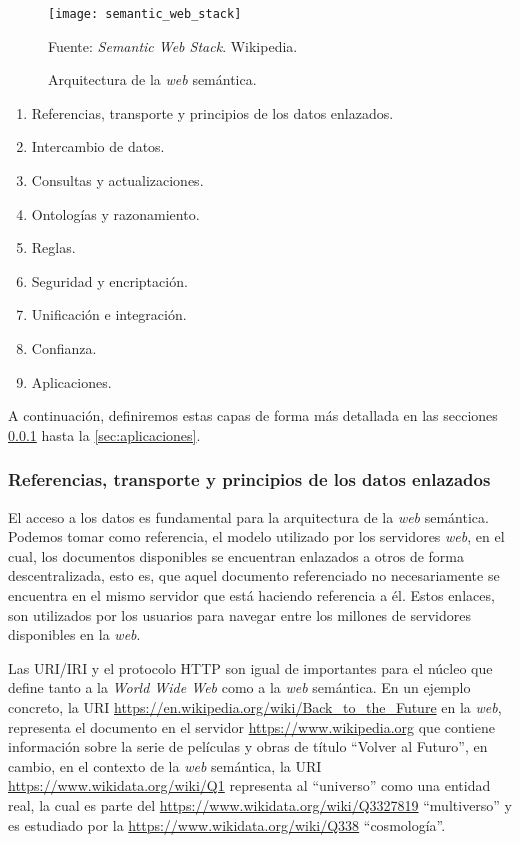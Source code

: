 \begin{figure}
    \centering
    \texttt{[image: semantic\_web\_stack]}
    \caption{Arquitectura de la \textit{web} semántica.} Fuente:
    \textit{Semantic Web Stack}. Wikipedia.
    \label{fig:semantic-web-arq}
\end{figure}

\begin{enumerate}
    \item Referencias, transporte y principios de los datos enlazados.
    \item Intercambio de datos.
    \item Consultas y actualizaciones.
    \item Ontologías y razonamiento.
    \item Reglas.
    \item Seguridad y encriptación.
    \item Unificación e integración.
    \item Confianza.
    \item Aplicaciones.
\end{enumerate}

A continuación, definiremos estas capas de forma más detallada en las secciones
\ref{sec:refs-transporte-enlazados} hasta la \ref{sec:aplicaciones}.

\subsubsection{Referencias, transporte y principios de los datos enlazados}
\label{sec:refs-transporte-enlazados}

El acceso a los datos es fundamental para la arquitectura de la \textit{web}
semántica. Podemos tomar como referencia, el modelo utilizado por los servidores
\textit{web}, en el cual, los documentos disponibles se encuentran enlazados a
otros de forma descentralizada, esto es, que aquel documento referenciado no
necesariamente se encuentra en el mismo servidor que está haciendo referencia a
él. Estos enlaces, son utilizados por los usuarios para navegar entre los
millones de servidores disponibles en la \textit{web}.

Las URI/IRI y el protocolo HTTP son igual de importantes para el núcleo que
define tanto a la \textit{World Wide Web} como a la \textit{web} semántica. En
un ejemplo concreto, la URI
\url{https://en.wikipedia.org/wiki/Back_to_the_Future} en la \textit{web},
representa el documento en el servidor \url{https://www.wikipedia.org} que
contiene información sobre la serie de películas y obras de título ``Volver al
Futuro'', en cambio, en el contexto de la \textit{web} semántica, la URI
\url{https://www.wikidata.org/wiki/Q1} representa al ``universo'' como una
entidad real, la cual es parte del \url{https://www.wikidata.org/wiki/Q3327819}
``multiverso'' y es estudiado por la \url{https://www.wikidata.org/wiki/Q338}
``cosmología''.

